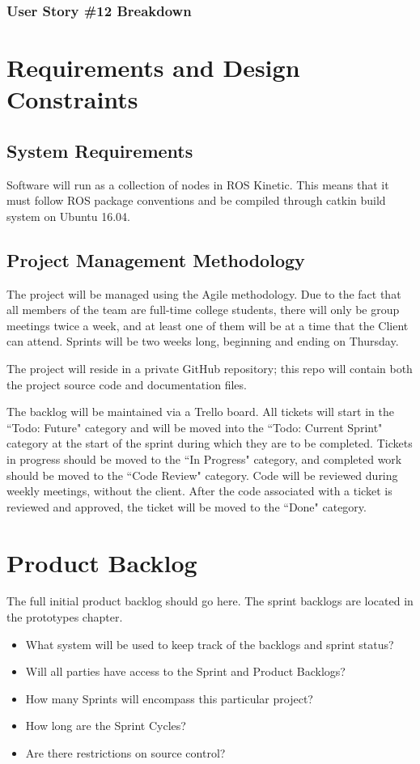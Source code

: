\subsubsection{User Story \#12 Breakdown}

\section{Requirements and Design Constraints}
\subsection{System  Requirements}
Software will run as a collection of nodes in ROS Kinetic. This means that it must follow ROS package conventions and be compiled through catkin build system on Ubuntu 16.04.

\subsection{Project  Management Methodology}
The project will be managed using the Agile methodology. Due to the fact that all members of the team are full-time college students, there will only be group meetings twice a week, and at least one of them will be at a time that the Client can attend. Sprints will be two weeks long, beginning and ending on Thursday.

The project will reside in a private GitHub repository; this repo will contain both the project source code and documentation files.

The backlog will be maintained via a Trello board. All tickets will start in the ``Todo: Future" category and will be moved into the ``Todo: Current Sprint" category at the start of the sprint during which they are to be completed. Tickets in progress should be moved to the ``In Progress" category, and completed work should be moved to the ``Code Review" category. Code will be reviewed during weekly meetings, without the client. After the code associated with a ticket is reviewed and approved, the ticket will be moved to the ``Done" category.

\section{Product Backlog}
The full initial product backlog should go here.  The sprint backlogs are located in the prototypes chapter.

 
\begin{itemize}
\item What system will be used to keep track of the backlogs and sprint status?
\item Will all parties have access to the Sprint and Product Backlogs?
\item How many Sprints will encompass this particular project?
\item How long are the Sprint Cycles?
\item Are there restrictions on source control? 
\end{itemize}


